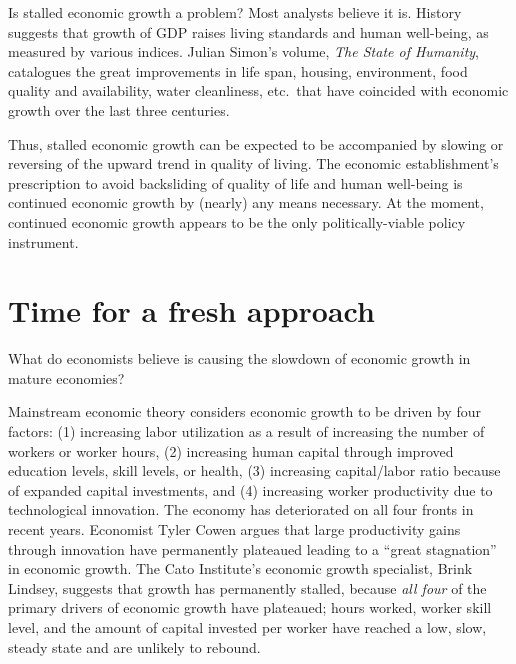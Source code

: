 Is stalled economic growth a problem? 
Most analysts believe it is. 
History suggests that growth of GDP 
raises living standards and human well-being,
as measured by various indices. 
Julian Simon's volume, \emph{The State of Humanity}, 
catalogues the great improvements in 
life span, 
housing, 
environment, 
food quality and availability, 
water cleanliness, 
etc.\ 
that have coincided with 
economic growth over the last three centuries.\cite{simon1996} 

Thus, stalled economic growth can be expected 
to be accompanied by slowing or reversing
of the upward trend in quality of living. 
The economic establishment's prescription
to avoid backsliding of quality of life and human well-being
is continued economic growth by (nearly) any means necessary. 
At the moment, continued economic growth appears to be the only 
politically-viable policy instrument.



\section{Time for a fresh approach}
\label{sec:fresh_approach}

What do economists believe is causing the slowdown
of economic growth in mature economies? 

Mainstream economic theory considers 
economic growth to be driven by four factors: 
(1) increasing labor utilization as a result of increasing the number of workers or worker hours, 
(2) increasing human capital through improved education levels, skill levels, or health, 
(3) increasing capital/labor ratio because of expanded capital investments, and 
(4) increasing worker productivity due to technological innovation. 
The economy has deteriorated on all four fronts in recent years.
Economist Tyler Cowen argues that large productivity gains 
through innovation have permanently plateaued 
leading to a ``great stagnation'' in economic growth.\cite{Cowen2011}
The Cato Institute's economic growth specialist, Brink Lindsey, 
suggests that growth has permanently stalled, 
because \emph{all four} of the primary drivers of economic growth have plateaued; 
hours worked, 
worker skill level, and
the amount of capital invested per worker 
have reached 
a low, slow, steady state 
and are unlikely to rebound.\cite{lindsey2013} 

